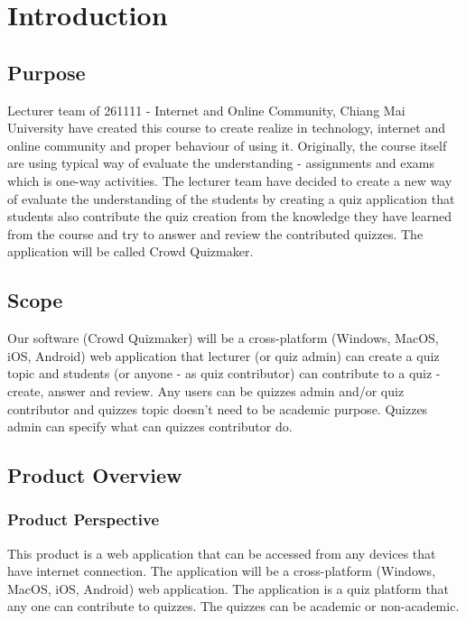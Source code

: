 \documentclass[ 10pt]{report}
\begin{document}

    \renewcommand*\contentsname{Table of Contents}
    \tableofcontents
    \pagebreak

    \chapter{Introduction}
        \section{Purpose}
        Lecturer team of 261111 - Internet and Online Community, Chiang Mai University have created this course to create realize in technology, internet and online community and proper behaviour of using it. Originally, the course itself are using typical way of evaluate the understanding - assignments and exams which is one-way activities. The lecturer team have decided to create a new way of evaluate the understanding of the students by creating a quiz application that students also contribute the quiz creation from the knowledge they have learned from the course and try to answer and review the contributed quizzes. The application will be called Crowd Quizmaker.
        \section{Scope}
        Our software (Crowd Quizmaker) will be a cross-platform (Windows, MacOS, iOS, Android) web application that lecturer (or quiz admin) can create a quiz topic and students (or anyone - as quiz contributor) can contribute to a quiz - create, answer and review. Any users can be quizzes admin and/or quiz contributor and quizzes topic doesn't need to be academic purpose. Quizzes admin can specify what can quizzes contributor do.
        \section{Product Overview}
            \subsection{Product Perspective}
            This product is a web application that can be accessed from any devices that have internet connection. The application will be a cross-platform (Windows, MacOS, iOS, Android) web application. The application is a quiz platform that any one can contribute to quizzes. The quizzes can be academic or non-academic.
\end{document}
